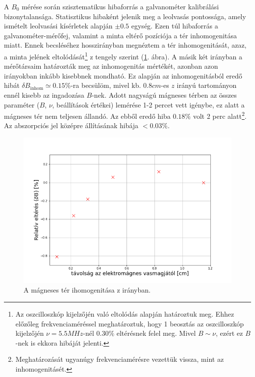 \documentclass[a4paper,12pt]{article}
\begin{document}
A $B_0$ mérése során szisztematikus hibaforrás a galvanométer kalibrálási bizonytalansága. Statisztikus hibaként jelenik meg a leolvasás pontossága, amely ismételt leolvasási kísérletek alapján $\pm 0.5$ egység. Ezen túl hibaforrás a galvanométer-mérőfej, valamint a minta eltérő pozíciója a tér inhomogenitása miatt. Ennek becsléséhez hosszirányban megnéztem a tér inhomogenitását, azaz, a minta jelének eltolódását\footnote{Az oszcilloszkóp kijelzőjén való eltolódás alapján határoztuk meg. Ehhez előzőleg frekvenciaméréssel meghatároztuk, hogy 1 beosztás az oszcilloszkóp kijelzőjén $\nu=5.5MHz$-nél $0.30\%$ eltérésnek felel meg. Mivel $B\sim \nu$, ezért ez $B$-nek is ekkora hibáját jelenti.} z tengely szerint (\ref{fig:z_inhom}. ábra). A másik két irányban a mérőtársaim határozták meg az inhomogenitás mértékét, azonban azon irányokban inkább kisebbnek mondható. Ez alapján az inhomogenitásból eredő hibát $\delta B_\text{inhom} \simeq 0.15\%$-ra becsülöm, mivel kb. $0.8cm$-es $z$ irányú tartományon ennél kisebb az ingadozása $B$-nek. Adott nagyságú mágneses térben az összes paraméter ($B$, $\nu$, beállítások értékei) lemérése 1-2 percet vett igénybe, ez alatt a mágneses tér nem teljesen állandó. Az ebből eredő hiba $0.18\%$ volt 2 perc alatt\footnote{Meghatározását ugyanúgy frekvenciamérésre vezettük vissza, mint az inhomogenitásét.}. Az abszorpciós jel középre állításának hibája $< 0.03\%$.

\begin{figure}[h]
\centering
    \begin{minipage}{.99\textwidth}
        \centering
        \includegraphics[width=1.\linewidth]{inhom.png}
    \end{minipage}
    \caption{A mágneses tér ihomogenitása z irányban.}
    \label{fig:z_inhom}
\end{figure}
\end{document}
